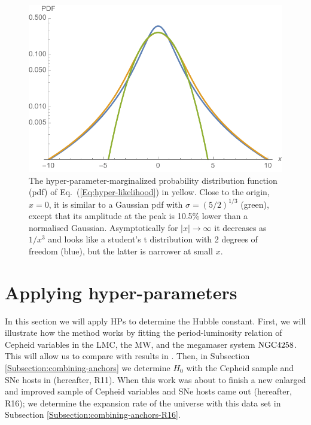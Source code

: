 \begin{figure}[hbtp]
\centering
\includegraphics[width=\textwidth]{figures/chapter-h0/hyperparam_like.pdf}
\caption{The hyper-parameter-marginalized probability distribution function (pdf) of Eq.\ (\ref{Eq:hyper-likelihood}) in yellow. Close to the origin, $x=0$, it is similar to a Gaussian pdf with $\sigma = (5/2)^{1/3}$ (green), except that its amplitude at the peak is 10.5\% lower than a normalised Gaussian. Asymptotically for $|x|\rightarrow\infty$ it decreases as $1/x^3$ and looks like a student's t distribution with 2 degrees of freedom (blue), but the latter is narrower at small $x$.}
\end{figure}

\section{Applying hyper-parameters}
\label{chapter-h0:Application}

In this section we will apply HPs to determine the Hubble constant. First, we will illustrate how the method works by fitting the period-luminosity relation of Cepheid variables in the LMC, the MW, and the megamaser system $\mathrm{NGC4258}$. This will allow us to compare with results in \cite{Efstathiou:2013via}. Then, in Subsection \ref{Subsection:combining-anchors} we determine $H_0$ with the Cepheid sample and SNe hosts in \cite{Riess:2011yx} (hereafter, R11). When this work was about to finish a new enlarged and improved sample of Cepheid variables and SNe hosts came out \cite{Riess:2016jrr} (hereafter, R16); we determine the expansion rate of the universe with this data set in Subsection \ref{Subsection:combining-anchors-R16}.  

